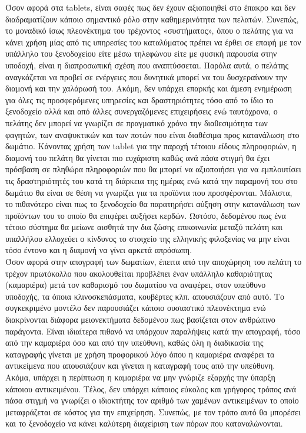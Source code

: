 \noindent	
Όσον αφορά στα tablets, είναι σαφές πως δεν έχουν αξιοποιηθεί στο έπακρο και δεν διαδραματίζουν
κάποιο σημαντικό ρόλο στην καθημερινότητα των πελατών. Συνεπώς, το μοναδικό ίσως πλεονέκτημα του
τρέχοντος «συστήματος», όπου ο πελάτης για να κάνει χρήση μίας από τις υπηρεσίες του καταλύματος
πρέπει να έρθει σε επαφή με τον υπάλληλο του ξενοδοχείου είτε μέσω τηλεφώνου είτε με φυσική 
παρουσία στην υποδοχή, είναι η διαπροσωπική σχέση που αναπτύσσεται. Παρόλα αυτά, ο πελάτης 
αναγκάζεται να προβεί σε ενέργειες που δυνητικά μπορεί να του δυσχεραίνουν την διαμονή και την 
χαλάρωσή του. Ακόμη, δεν υπάρχει επαρκής και άμεση ενημέρωση για όλες τις προσφερόμενες υπηρεσίες 
και δραστηριότητες τόσο από το ίδιο το ξενοδοχείο αλλά και από άλλες συνεργαζόμενες επιχειρήσεις 
ενώ ταυτόχρονα, ο πελάτης δεν μπορεί να γνωρίζει σε πραγματικό χρόνο την διαθεσιμότητα των 
φαγητών, των αναψυκτικών και των ποτών που είναι διαθέσιμα προς κατανάλωση στο δωμάτιο. 
Κάνοντας χρήση των tablet για την παροχή τέτοιου είδους πληροφοριών, η διαμονή του πελάτη θα 
γίνεται πιο ευχάριστη καθώς ανά πάσα στιγμή θα έχει πρόσβαση σε πληθώρα πληροφοριών που θα 
μπορεί να αξιοποιήσει για να εμπλουτίσει τις δραστηριότητές του κατά τη διάρκεια της ημέρας ενώ κατά 
την παραμονή του στο δωμάτιο θα είναι σε θέση να γνωρίζει για τα προϊόντα που προσφέρονται. 
Μάλιστα, το πιθανότερο είναι πως το ξενοδοχείο θα παρατηρήσει αύξηση στην κατανάλωση των 
προϊόντων του το οποίο θα επιφέρει αυξήσει κερδών. Ωστόσο, δεδομένου πως ένα τέτοιο σύστημα θα 
μείωνε αισθητά την δια ζώσης επικοινωνία μεταξύ πελάτη και υπαλλήλου ελλοχεύει ο κίνδυνος το 
στοιχείο της ελληνικής φιλοξενίας να μην είναι τόσο έντονο και η διαμονή να γίνει αρκετά απρόσωπη.\\
	
\noindent
Όσον αφορά στην απογραφή των δωματίων, έπειτα από την αποχώρηση του πελάτη το τρέχον 
πρωτόκολλο που ακολουθείται προβλέπει έναν υπάλληλο καθαριότητας (καμαριέρα) μετά τον καθαρισμό 
του δωματίου να αναφέρει, στον υπεύθυνο υποδοχής, τα όποια κλινοσκεπάσματα, κουβέρτες κλπ. 
απουσιάζουν από αυτό. Το συγκεκριμένο μοντέλο δεν παρουσιάζει κάποιο ουσιαστικό πλεονέκτημα ενώ 
διακρίνονται διάφορα μειονεκτήματα δεδομένου πως βασίζεται στον ανθρώπινο παράγοντα. Είναι 
ιδιαίτερα πιθανό να υπάρχουν παραλήψεις κατά την απογραφή, τόσο από την καμαριέρα όσο και από την 
υπεύθυνη, καθώς όλη η διαδικασία της καταγραφής γίνεται με χρήση προφορικού λόγο όπου η καμαριέρα 
αναφέρει τα αντικείμενα που απουσιάζουν και γίνεται η καταγραφή τους από την υπεύθυνη. Ακόμα, 
υπάρχει η περίπτωση η καμαριέρα να μην γνώριζε εξαρχής την ύπαρξη κάποιου αντικειμένου. Τέλος, δεν 
υπάρχει κάποιος εύκολος και γρήγορος τρόπος ανά πάσα στιγμή να γνωρίζει ο ιδιοκτήτης τον αριθμό των 
χαμένων αντικειμένων το οποίο μεταφράζεται σε κόστος για την επιχείρηση. Συνεπώς, με τον τρόπο 
αυτό θα μπορέσει και το ξενοδοχείο να κάνει καλύτερη διαχείριση των πόρων που καταναλώνονται.


